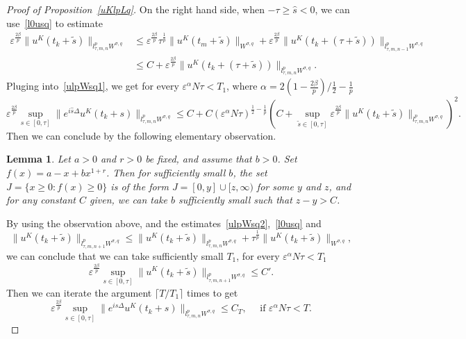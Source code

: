 \documentclass[10pt,a4paper]{article}
\newtheorem{lemma}[theorem]{Lemma}
\begin{document}
\begin{proof}[Proof of Proposition~\ref{uKlpLq}]
    On the right hand side, when \(-\tau \geq \hat s<0\), we can use~\eqref{l0usq} to estimate 
    \begin{equation}
      \begin{aligned}
        \varepsilon^{\frac{2\beta}p} \|u^K(t_k+\tilde{s})\|_{l^p_{\tau,m,n}W^{\sigma,q}}
        &\leq \varepsilon^{\frac{2\beta}p} \tau^\frac1p \|u^K(t_m+\tilde{s})\|_{W^{\sigma,q}}
        + \varepsilon^{\frac{2\beta}p} \|u^K(t_k+(\tau+\tilde{s}))\|_{l^p_{\tau,m,n-1}W^{\sigma,q}} \\
        &\leq C + \varepsilon^{\frac{2\beta}p} \|u^K(t_k+(\tau+\tilde{s}))\|_{l^p_{\tau,m,n}W^{\sigma,q}}.
      \end{aligned}
    \end{equation}
    Pluging into~\eqref{ulpWsq1}, we get for every \(\varepsilon^\alpha N \tau <
    T_1 \), where \(\alpha = {2(1-\frac{2\beta}p)}/{\frac12-\frac1p}\)
    \begin{equation}\label{ulpWsq2}
      \varepsilon^{\frac{2\beta}p}\sup_{s\in[0,\tau]}\|e^{i\hat s\Delta}u^K(t_k+s)\|_{l^p_{\tau,m,n}W^{\sigma,q}} 
      \leq C + C (\varepsilon^\alpha N\tau)^{\frac12-\frac1p}
      \left(C + \sup_{\tilde{s} \in [0, \tau]} \varepsilon^{\frac{2\beta}p}
      \|u^K(t_k+\tilde{s})\|_{l^p_{\tau,m,n}W^{\sigma,q}}\right)^2.
    \end{equation}
    Then we can conclude by the following elementary observation. 

    \begin{lemma}
      Let \(a>0\) and \(r>0\) be fixed, and assume that \(b>0\). Set
      \(f(x)=a-x+bx^{1+r}\). Then for sufficiently small \(b\), the set 
      \(J = \{x\geq0:f(x)\geq0\}\) is of the form \(J=[0,y]\cup[z,\infty)\) for
      some \(y\) and \(z\), and for any constant \(C\) given, we can take \(b\)
      sufficiently small such that \(z-y>C\).
    \end{lemma}

    By using the observation above, and the estimates~\eqref{ulpWsq2},~\eqref{l0usq} and
    \[ \|u^K(t_k+\tilde{s})\|_{l^p_{\tau,m,n+1}W^{\sigma,q}} \leq
    \|u^K(t_k+\tilde{s})\|_{l^p_{\tau,m,n}W^{\sigma,q}} + \tau^\frac1p \|u^K(t_k+\tilde{s})\|_{W^{\sigma,q}},\]
    we can conclude that we can take sufficiently small \(T_1\), for every
    \(\varepsilon^\alpha N\tau < T_1\) 
    \[ \varepsilon^{\frac{2\beta}p} \sup_{s\in[0,\tau]} \|u^K(t_k+\tilde{s})\|_{l^p_{\tau,m,n+1}W^{\sigma,q}} \leq C'.\]
    Then we can iterate the argument \( \lceil T/T_1 \rceil \) times to get
    \[ \varepsilon^{\frac{2\beta}p} \sup_{s\in[0,\tau]} \|e^{i\hat{s}\Delta}u^K(t_k+s)\|_{l^p_{\tau,m,n}W^{\sigma,q}}
      \leq C_T,\quad \text{ if } \varepsilon^\alpha N\tau < T. \]
  \end{proof}
  
\end{document}
